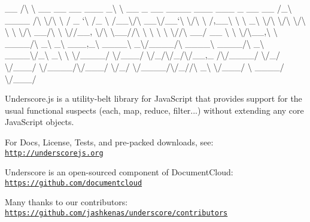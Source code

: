 \+\_\+\+\_\+ /\textbackslash{} \textbackslash{} \+\_\+\+\_\+ \+\_\+\+\_\+ \+\_\+\+\_\+ \+\_\+\+\_\+\+\_\+ \+\_\+\textbackslash{} \textbackslash{} \+\_\+\+\_\+ \+\_\+ \+\_\+\+\_\+ \+\_\+\+\_\+\+\_\+\+\_\+ \+\_\+\+\_\+\+\_\+ \+\_\+\+\_\+\+\_\+ \+\_\+ \+\_\+\+\_\+ \+\_\+\+\_\+ /\+\_\+\textbackslash{} \+\_\+\+\_\+\+\_\+\+\_\+ /\textbackslash{} \textbackslash{}/\textbackslash{} \textbackslash{} /\textquotesingle{} \+\_\+ `\textbackslash{} /\textquotesingle{}\+\_\+ \textbackslash{} /\textquotesingle{}\+\_\+\+\_\+{\ttfamily \textbackslash{}/\textbackslash{} \+\_\+\+\_\+\textbackslash{}/ ,\+\_\+\+\_\+\textbackslash{} / \+\_\+\+\_\+\+\_\+\textbackslash{} / \+\_\+\+\_\+}\textbackslash{}/\textbackslash{} \+\_\+\+\_\+\textbackslash{}/\textquotesingle{}\+\_\+\+\_\+`\textbackslash{} \textbackslash{}/\textbackslash{} \textbackslash{} /\textquotesingle{},\+\_\+\+\_\+\textbackslash{} \textbackslash{} \textbackslash{} \+\_\+\textbackslash{} \textbackslash{}/\textbackslash{} \textbackslash{}/\textbackslash{} \textbackslash{}/\textbackslash{} \textbackslash{} \textbackslash{} \textbackslash{}/\textbackslash{} \+\_\+\+\_\+/\textbackslash{} \textbackslash{} \textbackslash{}//\+\_\+\+\_\+, {\ttfamily \textbackslash{}/\textbackslash{} \textbackslash{}\+\_\+\+\_\+//\textbackslash{} \textbackslash{} \textbackslash{} \textbackslash{} \textbackslash{} \textbackslash{}//\textbackslash{} \+\_\+\+\_\+/ \+\_\+\+\_\+ \textbackslash{} \textbackslash{} \textbackslash{}/\textbackslash{}\+\_\+\+\_\+,}\textbackslash{} \textbackslash{} \+\_\+\+\_\+\+\_\+\+\_\+/\textbackslash{} \+\_\+\textbackslash{} \+\_\+\textbackslash{} \+\_\+\+\_\+\+\_\+,\+\_\+\textbackslash{} \+\_\+\+\_\+\+\_\+\+\_\+\textbackslash{} \+\_\+\textbackslash{}/\+\_\+\+\_\+\+\_\+\+\_\+/\textbackslash{} \+\_\+\+\_\+\+\_\+\+\_\+\textbackslash{} \+\_\+\+\_\+\+\_\+\+\_\+/\textbackslash{} \+\_\+\textbackslash{} \+\_\+\+\_\+\+\_\+\+\_\+\textbackslash{}/\+\_\+\textbackslash{} \+\_\+\textbackslash{} \textbackslash{} \textbackslash{}/\+\_\+\+\_\+\+\_\+\+\_\+/ \textbackslash{}/\+\_\+\+\_\+\+\_\+/ \textbackslash{}/\+\_\+/\textbackslash{}/\+\_\+/\textbackslash{}/\+\_\+\+\_\+,\+\_\+ /\textbackslash{}/\+\_\+\+\_\+\+\_\+\+\_\+/ \textbackslash{}/\+\_\+/ \textbackslash{}/\+\_\+\+\_\+\+\_\+/ \textbackslash{}/\+\_\+\+\_\+\+\_\+\+\_\+/\textbackslash{}/\+\_\+\+\_\+\+\_\+/ \textbackslash{}/\+\_\+/ \textbackslash{}/\+\_\+\+\_\+\+\_\+\+\_\+/\textbackslash{}/\+\_\+//\textbackslash{} \+\_\+\textbackslash{} \textbackslash{}/\+\_\+\+\_\+\+\_\+/ \textbackslash{} \+\_\+\+\_\+\+\_\+\+\_\+/ \textbackslash{}/\+\_\+\+\_\+\+\_\+/

Underscore.\+js is a utility-\/belt library for Java\+Script that provides support for the usual functional suspects (each, map, reduce, filter...) without extending any core Java\+Script objects.

For Docs, License, Tests, and pre-\/packed downloads, see\+: \href{http://underscorejs.org}{\tt http\+://underscorejs.\+org}

Underscore is an open-\/sourced component of Document\+Cloud\+: \href{https://github.com/documentcloud}{\tt https\+://github.\+com/documentcloud}

Many thanks to our contributors\+: \href{https://github.com/jashkenas/underscore/contributors}{\tt https\+://github.\+com/jashkenas/underscore/contributors} 